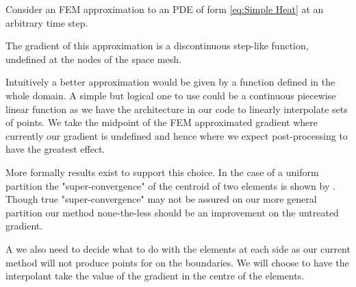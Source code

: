 \documentclass{uonmathreport}
\theoremstyle{definition}
\theoremstyle{problem}
\theoremstyle{theorem}
\begin{document}
Consider an FEM approximation to an PDE of form \ref{eq:Simple Heat} at an arbitrary time step.

\begin{center}
\end{center}

The gradient of this approximation is a discontinuous step-like function, undefined at the nodes of the space mesh.

\begin{center}
\end{center}

Intuitively a better approximation would be given by a function defined in the whole domain. A simple but logical one to use could be a continuous piecewise linear function as we have the architecture in our code to linearly interpolate sets of points. We take the midpoint of the FEM approximated gradient where currently our gradient is undefined and hence where we expect post-processing to have the greatest effect. 

More formally results exist to support this choice. In the case of a uniform partition the "super-convergence" of the centroid of two elements is shown by \cite{zlamal1978superconvergence}. Though true "super-convergence" may not be assured on our more general partition our method none-the-less should be an improvement on the untreated gradient. 

A we also need to decide what to do with the elements at each side as our current method will not produce points for on the boundaries. We will choose to have the interpolant take the value of the gradient in the centre of the elements.
\end{document}
